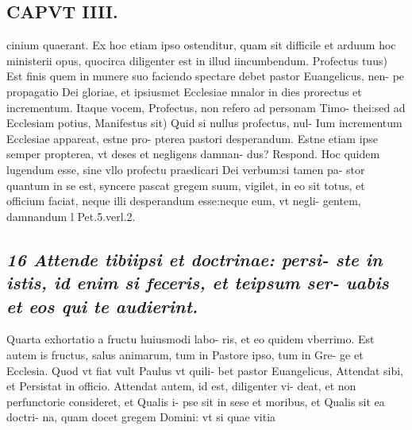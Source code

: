 \documentclass{article}
\begin{document}
\begin{pages}
\section*{CAPVT  IIII. }
\marginpar{[ p.237 ]}\pstart cinium quaerant. Ex hoc etiam ipso ostenditur, quam sit difficile et arduum hoc ministerii opus, quocirca diligenter est in illud iincumbendum. Profectus tuus) Est finis quem in munere suo faciendo spectare debet pastor Euangelicus, nen- pe propagatio Dei gloriae, et ipsiusmet Ecclesiae mnalor in dies prorectus et incrementum. Itaque vocem, Profectus, non refero ad personam Timo- thei:sed ad Ecclesiam potius,  \pend\pstart Manifestus sit) Quid si nullus profectus, nul- Ium incrementum Ecclesiae appareat, estne pro- pterea pastori desperandum. Estne etiam ipse semper propterea, vt deses et negligens damnan- dus? Respond. Hoc quidem lugendum esse, sine vllo profectu praedicari Dei verbum:si tamen pa- stor quantum in se est, syncere pascat gregem suum, vigilet, in eo sit totus, et officium faciat, neque illi desperandum esse:neque eum, vt negli- gentem, damnandum l Pet.5.verl.2.  \pend
{}
{}
\subsection*{\textit{16 Attende tibiipsi et doctrinae: persi- ste in istis, id enim si feceris, et teipsum ser- uabis et eos qui te audierint. }}\pstart Quarta exhortatio a fructu huiusmodi labo- ris, et eo quidem vberrimo. Est autem is fructus, salus animarum, tum in Pastore ipso, tum in Gre- ge et Ecclesia. Quod vt fiat vult Paulus vt quili- bet pastor Euangelicus, Attendat sibi, et Persistat in officio. Attendat autem, id est, diligenter vi- deat, et non perfunctorie consideret, et Qualis i- pse sit in sese et moribus, et Qualis sit ea doctri- na, quam docet gregem Domini: vt si quae vitia  \pend

\end{pages}
\end{document}
